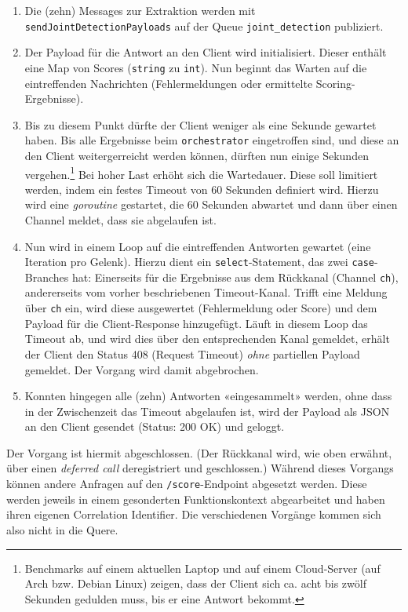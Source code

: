 \begin{enumerate}
    \item Die (zehn) Messages zur Extraktion werden mit \texttt{sendJointDetectionPayloads} auf der Queue \texttt{joint\_detection} publiziert.
    \item Der Payload für die Antwort an den Client wird initialisiert. Dieser enthält eine Map von Scores (\texttt{string} zu \texttt{int}). Nun beginnt das Warten auf die eintreffenden Nachrichten (Fehlermeldungen oder ermittelte Scoring-Ergebnisse).
    \item Bis zu diesem Punkt dürfte der Client weniger als eine Sekunde gewartet haben. Bis alle Ergebnisse beim \texttt{orchestrator} eingetroffen sind, und diese an den Client weitergerreicht werden können, dürften nun einige Sekunden vergehen.\footnote{Benchmarks auf einem aktuellen Laptop und auf einem Cloud-Server (auf Arch bzw. Debian Linux) zeigen, dass der Client sich ca. acht bis zwölf Sekunden gedulden muss, bis er eine Antwort bekommt.} Bei hoher Last erhöht sich die Wartedauer. Diese soll limitiert werden, indem ein festes Timeout von 60 Sekunden definiert wird. Hierzu wird eine \textit{goroutine} gestartet, die 60 Sekunden abwartet und dann über einen Channel meldet, dass sie abgelaufen ist.
    \item Nun wird in einem Loop auf die eintreffenden Antworten gewartet (eine Iteration pro Gelenk). Hierzu dient ein \texttt{select}-Statement, das zwei \texttt{case}-Branches hat: Einerseits für die Ergebnisse aus dem Rückkanal (Channel \texttt{ch}), andererseits vom vorher beschriebenen Timeout-Kanal. Trifft eine Meldung über \texttt{ch} ein, wird diese ausgewertet (Fehlermeldung oder Score) und dem Payload für die Client-Response hinzugefügt. Läuft in diesem Loop das Timeout ab, und wird dies über den entsprechenden Kanal gemeldet, erhält der Client den Status 408 (Request Timeout) \textit{ohne} partiellen Payload gemeldet. Der Vorgang wird damit abgebrochen.
    \item Konnten hingegen alle (zehn) Antworten «eingesammelt» werden, ohne dass in der Zwischenzeit das Timeout abgelaufen ist, wird der Payload als JSON an den Client gesendet (Status: 200 OK) und geloggt.
\end{enumerate}

Der Vorgang ist hiermit abgeschlossen. (Der Rückkanal wird, wie oben erwähnt, über einen \textit{deferred call} deregistriert und geschlossen.) Während dieses Vorgangs können andere Anfragen auf den \texttt{/score}-Endpoint abgesetzt werden. Diese werden jeweils in einem gesonderten Funktionskontext abgearbeitet und haben ihren eigenen Correlation Identifier. Die verschiedenen Vorgänge kommen sich also nicht in die Quere.

